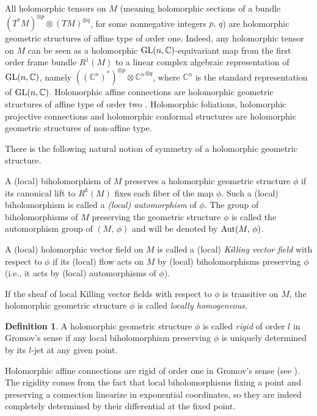 \documentclass[12pt,reqno]{amsart}
\theoremstyle{definition}
\newtheorem{definition}[theorem]{Definition}
\numberwithin{equation}{section}
\begin{document}
All holomorphic tensors on $M$ (meaning holomorphic sections of a bundle $(T^*M)^{\otimes p}\otimes 
(TM)^{\otimes q}$, for some nonnegative integers $p,\,q$) are holomorphic geometric structures of affine 
type of order one. Indeed, any holomorphic tensor on $M$ can be seen as a holomorphic ${\rm GL}(n, \mathbb 
C)$-equivariant map from the first order frame bundle $R^1(M)$ to a linear complex algebraic representation 
of ${\rm GL}(n, \mathbb C)$, namely $(({\mathbb C}^n)^*)^{\otimes p}\otimes {\mathbb C^n}^{\otimes q}$, 
where ${\mathbb C}^n$ is the standard representation of ${\rm GL}(n, \mathbb C)$. Holomorphic affine 
connections are holomorphic geometric structures of affine type of order two \cite{Gr,DG,Ben}. Holomorphic 
foliations, holomorphic projective connections and holomorphic conformal structures are holomorphic 
geometric structures of non-affine type.

There is the following natural notion of symmetry of a holomorphic geometric structure.

A (local) biholomorphism of $M$ preserves a holomorphic geometric structure $\phi$ if its canonical lift to 
$R^k(M)$ fixes each fiber of the map $\phi$. Such a (local) biholomorphism is called a {\it (local) 
automorphism} of $\phi$. The group of biholomorphisms of $M$ preserving the geometric structure $\phi$ is 
called the automorphism group of $(M,\, \phi)$ and will be denoted by ${\rm Aut}(M, \,\phi)$.

A (local) holomorphic vector field on $M$ is called a (local) {\it Killing vector field} with 
respect to $\phi$ if its (local) flow acts on $M$ by (local) biholomorphisms preserving $\phi$ (i.e., it
acts by (local) automorphisms of $\phi$).

If the sheaf of local Killing vector fields with respect to $\phi$ is transitive on $M$, the holomorphic 
geometric structure $\phi$ is called {\it locally homogeneous}.


\begin{definition}\label{def-rigid}
A holomorphic geometric structure $\phi$ is called {\it rigid} of order $l$ in 
Gromov's sense if any local biholomorphism preserving $\phi$ is uniquely determined by its 
$l$-jet at any given point.
\end{definition}

Holomorphic affine connections are rigid of order one in Gromov's sense (see \cite{Gr,DG, Ben}). The 
rigidity comes from the fact that local biholomorphisms fixing a point and preserving a connection 
linearize in exponential coordinates, so they are indeed completely determined by their differential at the 
fixed point.
\end{document}
